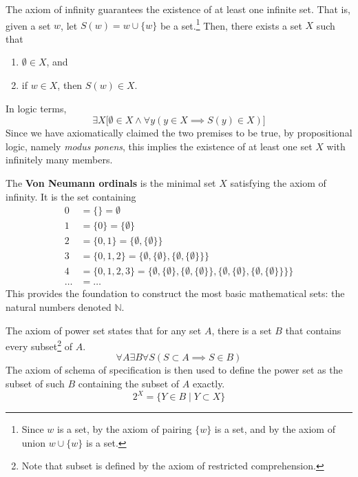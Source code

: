 \documentclass{article}
\begin{document}
    \begin{axiom}
      The axiom of infinity guarantees the existence of at least one infinite set. That is, given a set $w$, let $S(w) = w \cup \{w\}$ be a set.\footnote{Since $w$ is a set, by the axiom of pairing $\{w\}$ is a set, and by the axiom of union $w \cup \{w\}$ is a set.} Then, there exists a set $X$ such that 
      \begin{enumerate}
        \item $\emptyset \in X$, and 
        \item if $w \in X$, then $S(w) \in X$. 
      \end{enumerate} 
      In logic terms, 
      \begin{equation}
        \exists X \big[ \emptyset \in X \land \forall y (y \in X \implies S(y) \in X) \big]
      \end{equation}
      Since we have axiomatically claimed the two premises to be true, by propositional logic, namely \textit{modus ponens}, this implies the existence of at least one set $X$ with infinitely many members. 
    \end{axiom}

    \begin{definition} 
       The \textbf{Von Neumann ordinals} is the minimal set $X$ satisfying the axiom of infinity. It is the set containing 
      \begin{align*}
        0 & = \{\} = \emptyset \\
        1 & = \{0\} = \{\emptyset\} \\
        2 & = \{0,1\} = \{\emptyset,\{\emptyset\}\} \\
        3 & = \{0,1,2\} = \{\emptyset,\{\emptyset\},\{\emptyset,\{\emptyset\}\}\} \\
        4 & = \{0,1,2,3\} = \{\emptyset,\{\emptyset\},\{\emptyset,\{\emptyset\}\},\{\emptyset,\{\emptyset\},\{\emptyset,\{\emptyset\}\}\}\} \\
        \ldots & = \ldots 
      \end{align*} 
      This provides the foundation to construct the most basic mathematical sets: the natural numbers denoted $\mathbb{N}$.  
    \end{definition}

    \begin{axiom}
      The axiom of power set states that for any set $A$, there is a set $B$ that contains every subset\footnote{Note that subset is defined by the axiom of restricted comprehension.} of $A$. 
      \begin{equation}
        \forall A \exists B \forall S (S \subset A \implies S \in B)
      \end{equation}
      The axiom of schema of specification is then used to define the power set as the subset of such $B$ containing the subset of $A$ exactly. 
      \begin{equation}
        2^X = \{Y \in B \mid Y \subset X \}
      \end{equation}
    \end{axiom} 
\end{document}
